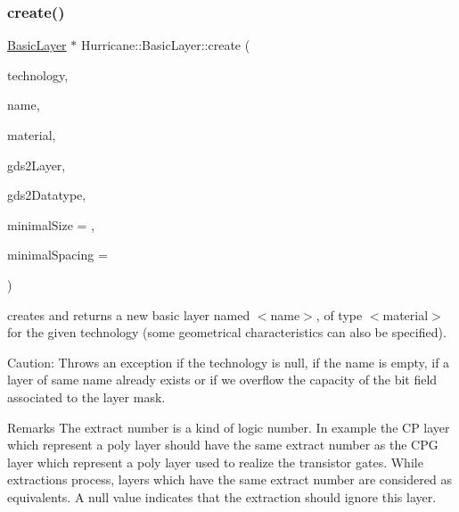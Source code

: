 \subsubsection{\texorpdfstring{create()}{create()}}
{\footnotesize\ttfamily \mbox{\hyperlink{classHurricane_1_1BasicLayer}{Basic\+Layer}} $\ast$ Hurricane\+::\+Basic\+Layer\+::create (\begin{DoxyParamCaption}\item[{\mbox{\hyperlink{classHurricane_1_1Technology}{Technology}} $\ast$}]{technology,  }\item[{const \mbox{\hyperlink{classHurricane_1_1Name}{Name}} \&}]{name,  }\item[{const \mbox{\hyperlink{classHurricane_1_1BasicLayer_1_1Material}{Material}} \&}]{material,  }\item[{unsigned}]{gds2\+Layer,  }\item[{unsigned}]{gds2\+Datatype,  }\item[{const \mbox{\hyperlink{group__DbUGroup_ga4fbfa3e8c89347af76c9628ea06c4146}{Db\+U\+::\+Unit}} \&}]{minimal\+Size = {},  }\item[{const \mbox{\hyperlink{group__DbUGroup_ga4fbfa3e8c89347af76c9628ea06c4146}{Db\+U\+::\+Unit}} \&}]{minimal\+Spacing = {} }\end{DoxyParamCaption})\hspace{0.3cm}{\ttfamily [static]}}

creates and returns a new basic layer named {\ttfamily $<$name$>$}, of type {\ttfamily $<$material$>$} for the given technology (some geometrical characteristics can also be specified).

\begin{DoxyParagraph}{Caution\+: Throws an exception if the technology is null, if the name is }
empty, if a layer of same name already exists or if we overflow the capacity of the bit field associated to the layer mask.
\end{DoxyParagraph}
\begin{DoxyRemark}{Remarks}
The extract number is a kind of logic number. In example the CP layer which represent a poly layer should have the same extract number as the C\+PG layer which represent a poly layer used to realize the transistor gates. While extractions process, layers which have the same extract number are considered as equivalents. A null value indicates that the extraction should ignore this layer. 
\end{DoxyRemark}
\mbox{\label{classHurricane_1_1BasicLayer_aeb7fd37db4ecf8e56e1992d6350fac58}} 

